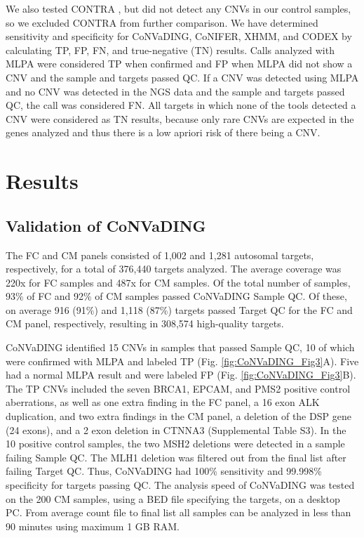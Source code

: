 We also tested CONTRA \cite{Li_2012}, but did not detect any CNVs in our control samples, so we excluded CONTRA from further comparison. 
We have determined sensitivity and specificity for CoNVaDING, CoNIFER, XHMM, and CODEX by calculating TP, FP, FN, and true-negative (TN) results. 
Calls analyzed with MLPA were considered TP when confirmed and FP when MLPA did not show a CNV and the sample and targets passed QC. 
If a CNV was detected using MLPA and no CNV was detected in the NGS data and the sample and targets passed QC, the call was considered FN. 
All targets in which none of the tools detected a CNV were considered as TN results, because only rare CNVs are expected in the genes analyzed and thus there is a low apriori risk of there being a CNV.

\section{Results}\label{results}

\subsection{Validation of CoNVaDING}
The FC and CM panels consisted of 1,002 and 1,281 autosomal targets, respectively, for a total of 376,440 targets analyzed. The average coverage was 220x for FC samples and 487x for CM samples. 
Of the total number of samples, 93\% of FC and 92\% of CM samples passed CoNVaDING Sample QC. 
Of these, on average 916 (91\%) and 1,118 (87\%) targets passed Target QC for the FC and CM panel, respectively, resulting in 308,574 high-quality targets. 

CoNVaDING identified 15 CNVs in samples that passed Sample QC, 10 of which were confirmed with MLPA and labeled TP (Fig. \ref{fig:CoNVaDING_Fig3}A). 
Five had a normal MLPA result and were labeled FP (Fig. \ref{fig:CoNVaDING_Fig3}B). 
The TP CNVs included the seven BRCA1, EPCAM, and PMS2 positive control aberrations, as well as one extra finding in the FC panel, a 16 exon ALK duplication, and two extra findings in the CM panel, a deletion of the DSP gene (24 exons), and a 2 exon deletion in CTNNA3 (Supplemental Table S3). 
In the 10 positive control samples, the two MSH2 deletions were detected in a sample failing Sample QC. 
The MLH1 deletion was filtered out from the final list after failing Target QC. 
Thus, CoNVaDING had 100\% sensitivity and 99.998\% specificity for targets passing QC. 
The analysis speed of CoNVaDING was tested on the 200 CM samples, using a BED file specifying the targets, on a desktop PC. 
From average count file to final list all samples can be analyzed in less than 90 minutes using maximum 1 GB RAM.

